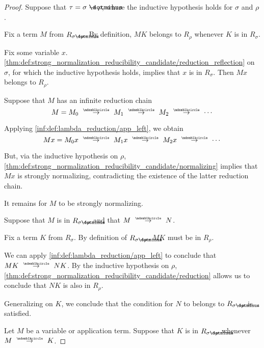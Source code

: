 \begin{proof}
   Suppose that \( \tau = \sigma \synimplies \rho \), where the inductive hypothesis holds for \( \sigma \) and \( \rho \).

   Fix a term \( M \) from \( R_{\sigma \synimplies \rho} \). By definition, \( MK \) belongs to \( R_\rho \) whenever \( K \) is in \( R_\sigma \).

  Fix some variable \( x \). \ref{thm:def:strong_normalization_reducibility_candidate/reduction_reflection} on \( \sigma \), for which the inductive hypothesis holds, implies that \( x \) is in \( R_\sigma \). Then \( Mx \) belongs to \( R_\rho \).

  Suppose that \( M \) has an infinite reduction chain
  \begin{equation*}
    M = M_0 \pred M_1 \pred M_2 \pred \cdots
  \end{equation*}

  Applying \ref{inf:def:lambda_reduction/app_left}, we obtain
  \begin{equation*}
    Mx = M_0 x \pred M_1 x \pred M_2 x \pred \cdots
  \end{equation*}

  But, via the inductive hypothesis on \( \rho \), \ref{thm:def:strong_normalization_reducibility_candidate/normalizing} implies that \( Mx \) is strongly normalizing, contradicting the existence of the latter reduction chain.

  It remains for \( M \) to be strongly normalizing.

   Suppose that \( M \) is in \( R_{\sigma \synimplies \rho} \) and that \( M \pred N \).

  Fix a term \( K \) from \( R_\sigma \). By definition of \( R_{\sigma \synimplies \rho} \), \( MK \) must be in \( R_\rho \).

  We can apply \ref{inf:def:lambda_reduction/app_left} to conclude that \( MK \pred NK \). By the inductive hypothesis on \( \rho \), \ref{thm:def:strong_normalization_reducibility_candidate/reduction} allows us to conclude that \( NK \) is also in \( R_\rho \).

  Generalizing on \( K \), we conclude that the condition for \( N \) to belongs to \( R_{\sigma \synimplies \rho} \) is satisfied.

   Let \( M \) be a variable or application term. Suppose that \( K \) is in \( R_{\sigma \synimplies \rho} \) whenever \( M \pred K \).


\end{proof}
